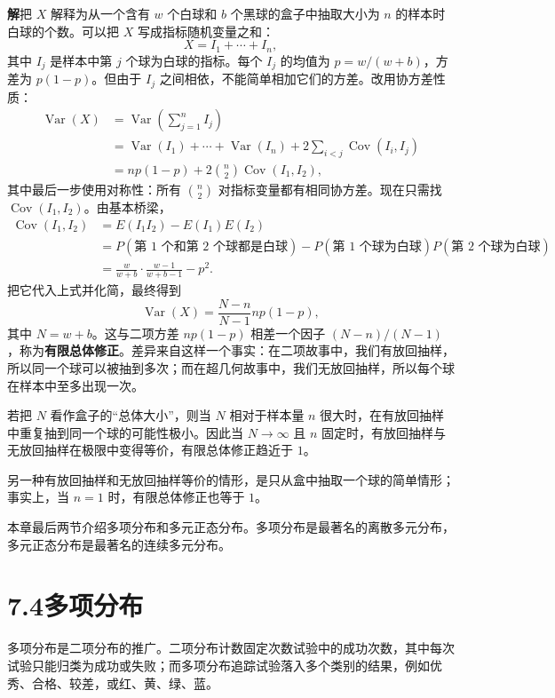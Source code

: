 \documentclass[UTF8, 12pt, fontset=fandol, oneside]{ctexart}
\begin{document}
\noindent\textbf{解}\quad 把 $X$ 解释为从一个含有 $w$ 个白球和 $b$ 个黑球的盒子中抽取大小为 $n$ 的样本时白球的个数。可以把 $X$ 写成指标随机变量之和：
\[
  X=I_1+\cdots+I_n,
\]
其中 $I_j$ 是样本中第 $j$ 个球为白球的指标。每个 $I_j$ 的均值为 $p=w/(w+b)$，方差为 $p(1-p)$。但由于 $I_j$ 之间相依，不能简单相加它们的方差。改用协方差性质：
\[
\begin{aligned}
  \operatorname{Var}(X)
  &=\operatorname{Var}\left(\sum_{j=1}^{n}I_j\right)\\
  &=\operatorname{Var}(I_1)+\cdots+\operatorname{Var}(I_n)
    +2\sum_{i<j}\operatorname{Cov}(I_i,I_j)\\
  &=np(1-p)+2{n\choose 2}\operatorname{Cov}(I_1,I_2),
\end{aligned}
\]
其中最后一步使用对称性：所有 ${n\choose 2}$ 对指标变量都有相同协方差。现在只需找 $\operatorname{Cov}(I_1,I_2)$。由基本桥梁，
\[
\begin{aligned}
  \operatorname{Cov}(I_1,I_2)
  &=E(I_1I_2)-E(I_1)E(I_2)\\
  &=P(\text{第 1 个和第 2 个球都是白球})
    -P(\text{第 1 个球为白球})P(\text{第 2 个球为白球})\\
  &=\frac{w}{w+b}\cdot \frac{w-1}{w+b-1}-p^2.
\end{aligned}
\]
把它代入上式并化简，最终得到
\[
  \operatorname{Var}(X)=\frac{N-n}{N-1}np(1-p),
\]
其中 $N=w+b$。这与二项方差 $np(1-p)$ 相差一个因子 $(N-n)/(N-1)$，称为\textbf{有限总体修正}。差异来自这样一个事实：在二项故事中，我们有放回抽样，所以同一个球可以被抽到多次；而在超几何故事中，我们无放回抽样，所以每个球在样本中至多出现一次。

若把 $N$ 看作盒子的“总体大小”，则当 $N$ 相对于样本量 $n$ 很大时，在有放回抽样中重复抽到同一个球的可能性极小。因此当 $N\to\infty$ 且 $n$ 固定时，有放回抽样与无放回抽样在极限中变得等价，有限总体修正趋近于 $1$。

另一种有放回抽样和无放回抽样等价的情形，是只从盒中抽取一个球的简单情形；事实上，当 $n=1$ 时，有限总体修正也等于 $1$。

本章最后两节介绍多项分布和多元正态分布。多项分布是最著名的离散多元分布，多元正态分布是最著名的连续多元分布。

\section*{7.4\quad 多项分布}

多项分布是二项分布的推广。二项分布计数固定次数试验中的成功次数，其中每次试验只能归类为成功或失败；而多项分布追踪试验落入多个类别的结果，例如优秀、合格、较差，或红、黄、绿、蓝。
\end{document}
